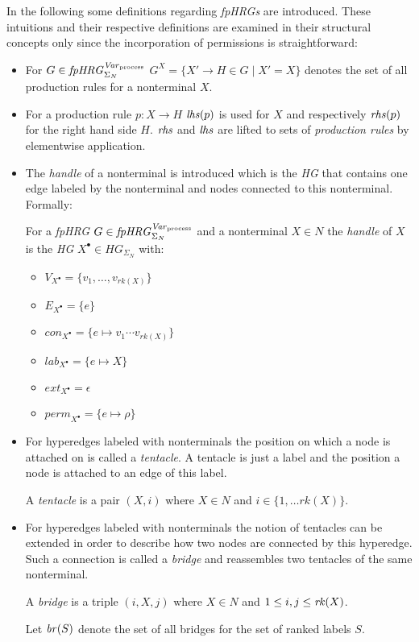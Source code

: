 	In the following some definitions regarding \emph{\acp{fpHRG}} are
	introduced. These intuitions and their respective definitions are examined
	in their structural concepts only since the incorporation of permissions is
	straightforward:
	\begin{itemize}
		\item For $G\in\mathit{fpHRG}_{\Sigma_{N}}^{\mathit{Var}_{\text{process}}}$ $G^{X} = \{ X'\rightarrow H\in G \mid X'=X\}$
			denotes the set of all production rules for a nonterminal $X$.
		\item For a production rule $p\colon X\rightarrow H$ $\mathit{lhs}(p)$ is used
			for $X$ and respectively $\mathit{rhs}(p)$ for the right hand side $H$. $\mathit{rhs}$
			and $\mathit{lhs}$ are lifted to sets of \emph{production rules} by
			elementwise application.
		\item The \emph{handle} of a nonterminal is introduced which is
			the \emph{\ac{HG}} that contains one edge labeled by the nonterminal
			and nodes connected to this nonterminal. Formally:
				\begin{definition}[Handle]
					For a \emph{\ac{fpHRG}} $G\in\mathit{fpHRG}_{\Sigma_{N}}^{\mathit{Var}_{\text{process}}}$ and a nonterminal $X\in N$
					the \emph{handle} of $X$ is the \emph{\ac{HG}} $X^{\bullet}
					\in\mathit{HG}_{\Sigma_{N}}$
					with:
					\begin{itemize}
						\item $V_{X^{\bullet}} = \{v_1,\dots,v_{\mathit{rk}(X)}\}$
						\item $E_{X^{\bullet}} = \{e\}$
						\item $\mathit{con}_{X^{\bullet}} =
							\{e\mapsto v_1\cdots v_{\mathit{rk}(X)}\}$
						\item $\mathit{lab}_{X^{\bullet}} =
							\{e\mapsto X\}$
						\item $\mathit{ext}_{X^{\bullet}} = \epsilon$
						\item $\mathit{perm}_{X^{\bullet}} = \{e\mapsto\rho\}$
					\end{itemize}
				\end{definition}
		\item For hyperedges labeled with nonterminals the position on
			which a node is attached on is called a \emph{tentacle}. A
			tentacle is just a label and the position a node is attached to an
			edge of this label.
				\begin{definition}[Tentacle]
					A \emph{tentacle} is a pair $(X,i)$ where $X\in N$ and
					$i\in\{1,\dots \mathit{rk}(X)\}$.
				\end{definition}
		\item For hyperedges labeled with nonterminals the notion of
			tentacles can be extended in order to describe how two nodes are
			connected by this hyperedge. Such a connection is called a
			\emph{bridge} and reassembles two tentacles of the same nonterminal.
				\begin{definition}[Bridge]
					A \emph{bridge} is a triple $(i, X, j)$ where $X\in N$ and
					$1\leq i,j\leq \mathit{rk}(X)$.
				\end{definition}
			Let $\mathit{br}(S)$ denote the set of all bridges for the set of ranked
			labels $S$.
	\end{itemize}
